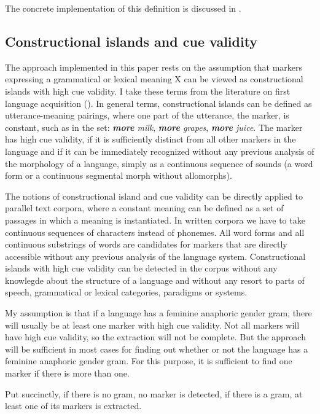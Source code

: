 \documentclass[output=collectionpaper]{langsci/langscibook}
\begin{document}
The concrete implementation of this definition is discussed in .


\subsection{Constructional islands and cue validity}
\label{sec:BW:2.5}

The approach implemented in this paper rests on the assumption that markers expressing a grammatical or lexical meaning X can be viewed as constructional islands with high cue validity. I take these terms from the literature on first language acquisition (\citealt[113]{Tomasello2003}). In general terms, constructional islands can be defined as utterance-meaning pairings, where one part of the utterance, the marker, is constant, such as in the set: \textit{\textbf{more} milk}, \textit{\textbf{more} grapes}, \textit{\textbf{more} juice}. The marker has high cue validity, if it is sufficiently distinct from all other markers in the language and if it can be immediately recognized without any previous analysis of the morphology of a language, simply as a continuous sequence of sounds (a word form or a continuous segmental morph without allomorphs).

The notions of constructional island and cue validity can be directly applied to parallel text corpora, where a constant meaning can be defined as a set of passages in which a meaning is instantiated. In written corpora we have to take continuous sequences of characters instead of phonemes. All word forms and all continuous substrings of words are candidates for markers that are directly accessible without any previous analysis of the language system. Constructional islands with high cue validity can be detected in the corpus without any knowlegde about the structure of a language and without any resort to parts of speech, grammatical or lexical categories, paradigms or systems.

My assumption is that if a language has a feminine anaphoric gender gram, there will usually be at least one marker with high cue validity. Not all markers will have high cue validity, so the extraction will not be complete. But the approach will be sufficient in most cases for finding out whether or not the language has a feminine anaphoric gender gram. For this purpose, it is sufficient to find one marker if there is more than one.

Put succinctly, if there is no gram, no marker is detected, if there is a gram, at least one of its markers is extracted.
\end{document}
